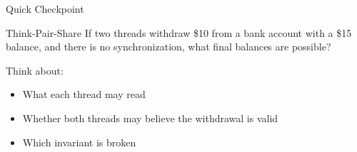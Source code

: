\documentclass[aspectratio=169,11pt]{beamer}
\begin{document}
	\begin{frame}{Quick Checkpoint}
		\begin{alertblock}{Think-Pair-Share}
			If two threads withdraw \$10 from a bank account with a \$15 balance,
			and there is no synchronization, what final balances are possible?
		\end{alertblock}
		
		\bigskip
		Think about:
		\begin{itemize}
			\item What each thread may read
			\item Whether both threads may believe the withdrawal is valid
			\item Which invariant is broken
		\end{itemize}
	\end{frame}
	
\end{document}
